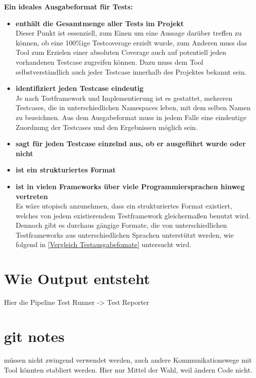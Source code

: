 \textbf{Ein ideales Ausgabeformat für Tests:}
\begin{itemize}
    \item \textbf{enthält die Gesamtmenge aller Tests im Projekt}\\
    Dieser Punkt ist essenziell, zum Einen um eine Aussage darüber treffen zu können, ob eine 100\%ige Testcoverage erzielt wurde, zum Anderen muss das Tool zum Erzielen einer absoluten Coverage auch auf potentiell jeden vorhandenen Testcase zugreifen können. Dazu muss dem Tool selbstverständlich auch jeder Testcase innerhalb des Projektes bekannt sein.
    \item \textbf{identifiziert jeden Testcase eindeutig}\\
    Je nach Testframework und Implementierung ist es gestattet, mehreren Testcases, die in unterschiedlichen Namespaces leben, mit dem selben Namen zu bezeichnen. Aus dem Ausgabeformat muss in jedem Falle eine eindeutige Zuordnung der Testcases und den Ergebnissen möglich sein. 
    \item \textbf{sagt für jeden Testcase einzelnd aus, ob er ausgeführt wurde oder nicht}
    \item \textbf{ist ein strukturiertes Format}\\
    \item \textbf{ist in vielen Frameworks über viele Programmiersprachen hinweg vertreten}\\
    Es wäre utopisch anzunehmen, dass ein strukturiertes Format existiert, welches von jedem existierendem Testframework gleichermaßen benutzt wird. Dennoch gibt es durchaus gängige Formate, die von unterschiedlichen Testframeworks aus unterschiedlichen Sprachen unterstützt werden, wie folgend in \ref{Vergleich Testausgabefomate} untersucht wird. 
\end{itemize}

\section{Wie Output entsteht}
Hier die Pipeline Test Runner -> Test Reporter



\section{git notes}
müssen nicht zwingend verwendet werden, auch andere Kommunikationswege mit Tool könnten etabliert werden. Hier nur Mittel der Wahl, weil ändern Code nicht.
